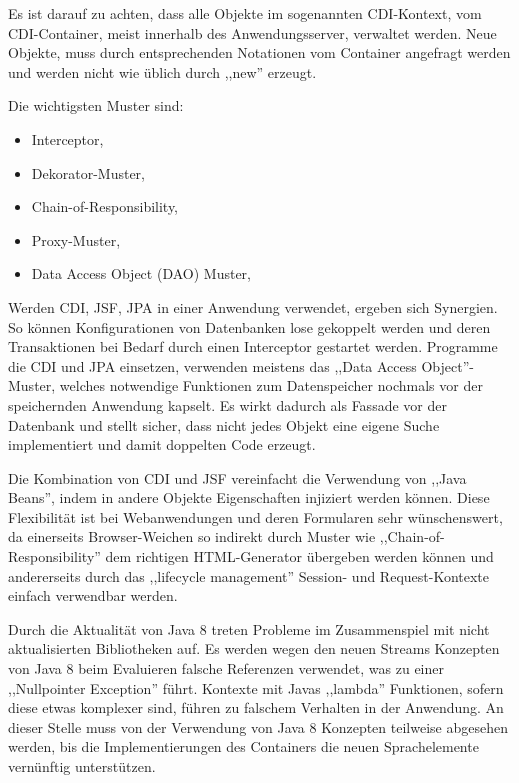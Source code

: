 \documentclass[oneside, ngerman, toc=bibliography,bibliography=totoc,listof=entryprefix, open=right,numbers=noenddot,fontsize=12pt]{scrbook}
\begin{document}
Es ist darauf zu achten, dass alle Objekte im sogenannten {CDI-Kontext}, vom CDI-Container, meist innerhalb des Anwendungsserver, verwaltet werden. Neue Objekte, muss durch entsprechenden Notationen vom Container angefragt werden und werden nicht wie üblich durch ,,new'' erzeugt.

\bigskip
Die wichtigsten Muster sind:

\begin{itemize}
    \item Interceptor, \cite{schmidt2002pattern}
    \item Dekorator-Muster, \cite{gamma2011entwurfsmuster}
    \item Chain-of-Responsibility, \cite{gamma2011entwurfsmuster}
    \item Proxy-Muster, \cite{gamma2011entwurfsmuster}
    \item Data Access Object (DAO) Muster, \cite{bien2003j2ee}
\end{itemize}

Werden {CDI}, {JSF}, {JPA} in einer Anwendung verwendet, ergeben sich Synergien. So können Konfigurationen von Datenbanken lose gekoppelt werden und deren Transaktionen bei Bedarf durch einen Interceptor gestartet werden. Programme die {CDI} und {JPA} einsetzen, verwenden meistens das ,,Data Access Object''-Muster, welches notwendige Funktionen zum Datenspeicher nochmals vor der speichernden Anwendung kapselt. Es wirkt dadurch als Fassade vor der Datenbank und stellt sicher, dass nicht jedes Objekt eine eigene Suche implementiert und damit doppelten Code erzeugt.

Die Kombination von {CDI} und {JSF} vereinfacht die Verwendung von ,,Java Beans'', indem in andere Objekte Eigenschaften injiziert werden können. Diese Flexibilität ist bei Webanwendungen und deren Formularen sehr wünschenswert, da einerseits Browser-Weichen so indirekt durch Muster wie  ,,Chain-of-Responsibility'' dem richtigen HTML-Generator übergeben werden können und andererseits durch das ,,lifecycle management'' Session- und Request-Kontexte einfach verwendbar werden. 

Durch die Aktualität von Java 8 treten Probleme im Zusammenspiel mit nicht aktualisierten Bibliotheken auf. Es werden wegen den neuen Streams Konzepten von Java 8 beim Evaluieren falsche Referenzen verwendet, was zu einer ,,Nullpointer Exception'' führt. Kontexte mit Javas ,,lambda'' Funktionen, sofern diese etwas komplexer sind, führen zu falschem Verhalten in der Anwendung.
An dieser Stelle muss von der Verwendung von Java 8 Konzepten teilweise abgesehen werden, bis die Implementierungen des Containers die neuen Sprachelemente vernünftig unterstützen.
\end{document}
